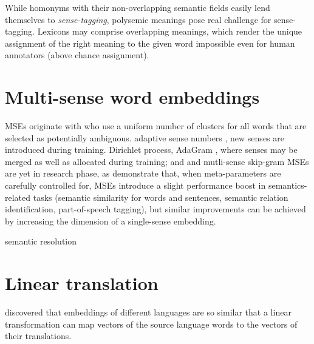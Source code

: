 \documentclass[11pt]{article}
\begin{document}
While homonyms with their non-overlapping semantic fields easily lend
themselves to \emph{sense-tagging}, polysemic meanings pose real challenge for
sense-tagging.  Lexicons may comprise overlapping meanings, which render the
unique assignment of the right meaning to the given word impossible even for
human annotators (above chance assignment). 



\section{Multi-sense word embeddings}

MSEs originate with \cite{Reisinger:2010,Huang:2012} who use a uniform number
of clusters for all words that are selected as potentially ambiguous.  adaptive
sense numbers \citep{Neelakantan:2014}, new senses are introduced during
training.  Dirichlet process, AdaGram \citep{Bartunov:2015}, where senses may
be merged as well as allocated during training; and and mutli-sense skip-gram
\citep{Li:2015}
MSEs are yet in research phase, as \cite{Li:2015}  demonstrate that, when
meta-parameters are carefully controlled for, MSEs introduce a slight
performance boost in semantics-related tasks (semantic similarity for words and
sentences, semantic relation identification, part-of-speech tagging), but
similar improvements can be achieved by increasing the dimension of a
single-sense embedding.

semantic resolution

\section{Linear translation}

 \cite{Mikolov:2013x} discovered that embeddings of different languages are so
 similar that a linear transformation can map vectors of the source language
 words to the vectors of their translations.  
\end{document}
